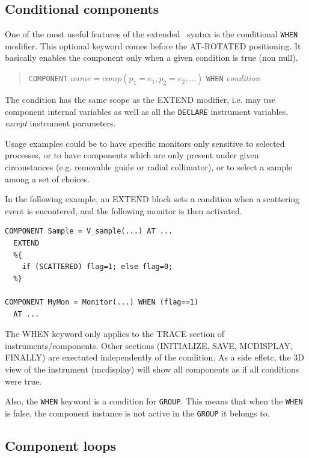 \subsection{Conditional components}
\label{s:instrdefs-extend-when}

One of the most useful features of the extended \MCS\ syntax is the conditional \texttt{WHEN} modifier. This optional keyword comes before the AT-ROTATED positioning. It basically enables the component only when a given condition is true (non null).

\begin{quote}
  \texttt{COMPONENT} $\textit{name} = \textit{comp}(p_1 = e_1, p_2 = e_2, \ldots)$
  \texttt{WHEN} {\it condition}
\end{quote}
The condition has the same scope as the EXTEND modifier, i.e. may use component internal variables as well as all the \texttt{DECLARE} instrument variables, \emph{except} instrument parameters.

Usage examples could be to have specific monitors only sensitive to selected processes, or to have components which are only present under given circonstances (e.g. removable guide or radial collimator), or to select a sample among a set of choices.

In the following example, an EXTEND block sets a condition when a scattering event is encoutered, and the following monitor is then activated.
\begin{verbatim}
COMPONENT Sample = V_sample(...) AT ...
  EXTEND
  %{
    if (SCATTERED) flag=1; else flag=0;
  %}

COMPONENT MyMon = Monitor(...) WHEN (flag==1)
  AT ...
\end{verbatim}

The WHEN keyword only applies to the TRACE section of instruments/components. Other sections (INITIALIZE, SAVE, MCDISPLAY, FINALLY) are exectuted independently of the condition. As a side effetc, the 3D view of the instrument (mcdisplay) will show all components as if all conditions were true.

Also, the \verb+WHEN+ keyword is a condition for \verb+GROUP+. This means that when the \verb+WHEN+ is false, the component instance is not active in the \verb+GROUP+ it belongs to.

\subsection{Component loops}
\label{s:instrdefs-extend-jump}

